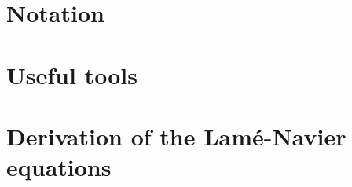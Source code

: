 \section{Notation}



\section{Useful tools}


\section{Derivation of the Lamé-Navier equations}
\label{sec:lame-navier}




\printindex


